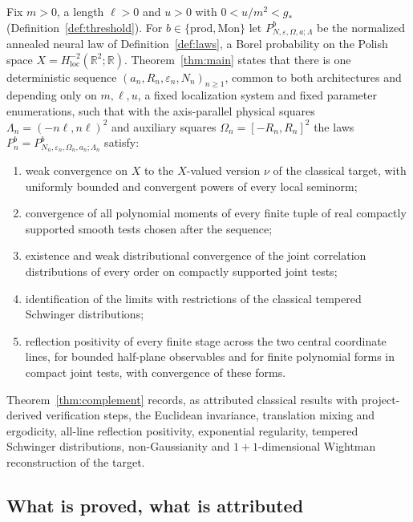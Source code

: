 \documentclass[11pt]{article}
\theoremstyle{plain}
\theoremstyle{definition}
\theoremstyle{remark}
\newcommand{\R}{\mathbb{R}}
\newcommand{\Hloc}{H^{-2}_{\mathrm{loc}}(\R^2;\R)}
\newcommand{\bprod}{\mathrm{prod}}
\newcommand{\bMon}{\mathrm{Mon}}
\begin{document}
Fix $m>0$, a length $\ell>0$ and $u>0$ with $0<u/m^{2}<g_{*}$
(Definition~\ref{def:threshold}). For $b\in\{\bprod,\bMon\}$ let
$P^{b}_{N,\varepsilon,\Omega,a;\Lambda}$ be the normalized annealed neural law
of Definition~\ref{def:laws}, a Borel probability on the Polish space
$X=\Hloc$. Theorem~\ref{thm:main} states that there is one deterministic
sequence $(a_n,R_n,\varepsilon_n,N_n)_{n\ge1}$, common to both architectures and
depending only on $m,\ell,u$, a fixed localization system and fixed parameter
enumerations, such that with the axis-parallel physical squares
$\Lambda_n=(-n\ell,n\ell)^{2}$ and auxiliary squares $\Omega_n=[-R_n,R_n]^{2}$
the laws $P^{b}_{n}=P^{b}_{N_n,\varepsilon_n,\Omega_n,a_n;\Lambda_n}$ satisfy:
\begin{enumerate}[label=(\Alph*)]
\item weak convergence on $X$ to the $X$-valued version $\nu$ of the classical
  target, with uniformly bounded and convergent powers of every local seminorm;
\item convergence of all polynomial moments of every finite tuple of real
  compactly supported smooth tests chosen after the sequence;
\item existence and weak distributional convergence of the joint correlation
  distributions of every order on compactly supported joint tests;
\item identification of the limits with restrictions of the classical tempered
  Schwinger distributions;
\item reflection positivity of every finite stage across the two central
  coordinate lines, for bounded half-plane observables and for finite
  polynomial forms in compact joint tests, with convergence of these forms.
\end{enumerate}
Theorem~\ref{thm:complement} records, as attributed classical results with
project-derived verification steps, the Euclidean invariance, translation
mixing and ergodicity, all-line reflection positivity, exponential regularity,
tempered Schwinger distributions, non-Gaussianity and $1+1$-dimensional
Wightman reconstruction of the target.

\subsection{What is proved, what is attributed}\label{sec:intro-layers}
\end{document}
